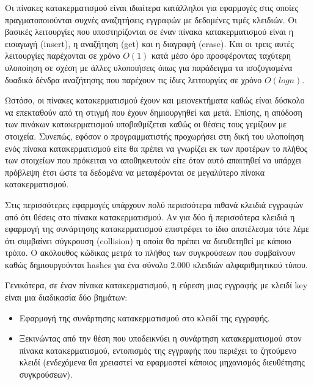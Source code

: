 






Οι πίνακες κατακερματισμού είναι ιδιαίτερα κατάλληλοι για εφαρμογές στις οποίες πραγματοποιούνται συχνές αναζητήσεις εγγραφών με δεδομένες τιμές κλειδιών. Οι βασικές λειτουργίες που υποστηρίζονται σε έναν πίνακα κατακερματισμού είναι η εισαγωγή (insert), η αναζήτηση (get) και η διαγραφή (erase). Και οι τρεις αυτές λειτουργίες παρέχονται σε χρόνο $O(1)$ κατά μέσο όρο προσφέροντας ταχύτερη υλοποίηση σε σχέση με άλλες υλοποιήσεις όπως για παράδειγμα τα ισοζυγισμένα δυαδικά δένδρα αναζήτησης που παρέχουν τις ίδιες λειτουργίες σε χρόνο $O(log n)$. 

Ωστόσο, οι πίνακες κατακερματισμού έχουν και μειονεκτήματα καθώς είναι δύσκολο να επεκταθούν από τη στιγμή που έχουν δημιουργηθεί και μετά. Επίσης, η απόδοση των πινάκων κατακερματισμού υποβαθμίζεται καθώς οι θέσεις τους γεμίζουν με στοιχεία. Συνεπώς, εφόσον ο προγραμματιστής προχωρήσει στη δική του υλοποίηση ενός πίνακα κατακερματισμού είτε θα πρέπει να γνωρίζει εκ των προτέρων το πλήθος των στοιχείων που πρόκειται να αποθηκευτούν είτε όταν αυτό απαιτηθεί να υπάρχει πρόβλεψη έτσι ώστε τα δεδομένα να μεταφέρονται σε μεγαλύτερο πίνακα κατακερματισμού.

Στις περισσότερες εφαρμογές υπάρχουν πολύ περισσότερα πιθανά κλειδιά εγγραφών από ότι θέσεις στο πίνακα κατακερματισμού. Αν για δύο ή περισσότερα κλειδιά η εφαρμογή της συνάρτησης κατακερματισμού επιστρέφει το ίδιο αποτέλεσμα τότε λέμε ότι συμβαίνει σύγκρουση (collision) η οποία θα πρέπει να διευθετηθεί με κάποιο τρόπο. Ο ακόλουθος κώδικας μετρά το πλήθος των συγκρούσεων που συμβαίνουν καθώς δημιουργούνται hashes για ένα σύνολο 2.000 κλειδιών αλφαριθμητικού τύπου.








Γενικότερα, σε έναν πίνακα κατακερματισμού, η εύρεση μιας εγγραφής με κλειδί key είναι μια διαδικασία δύο βημάτων:
\begin{itemize}[noitemsep]
\item Εφαρμογή της συνάρτησης κατακερματισμού στο κλειδί της εγγραφής.
\item Ξεκινώντας από την θέση που υποδεικνύει η συνάρτηση κατακερματισμού στον πίνακα κατακερματισμού, εντοπισμός της εγγραφής που περιέχει το ζητούμενο κλειδί (ενδεχόμενα θα χρειαστεί να εφαρμοστεί κάποιος μηχανισμός διευθέτησης συγκρούσεων). 
\end{itemize}


